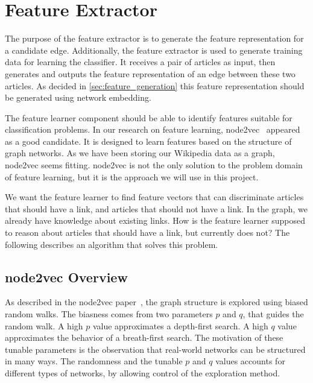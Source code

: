 \section{Feature Extractor}\label{feature_extractor}
The purpose of the feature extractor is to generate the feature representation for a candidate edge. Additionally, the feature extractor is used to generate training data for learning the classifier. It receives a pair of articles as input, then generates and outputs the feature representation of an edge between these two articles. As decided in \cref{sec:feature_generation} this feature representation should be generated using network embedding.




The feature learner component should be able to identify features suitable for classification problems. In our research on feature learning, node2vec~\cite{node2vec} appeared as a good candidate. It is designed to learn features based on the structure of graph networks. As we have been storing our Wikipedia data as a graph, node2vec seems fitting. node2vec is not the only solution to the problem domain of feature learning, but it is the approach we will use in this project.

We want the feature learner to find feature vectors that can discriminate articles that should have a link, and articles that should not have a link. In the graph, we already have knowledge about existing links. How is the feature learner supposed to reason about articles that should have a link, but currently does not? The following describes an algorithm that solves this problem.

\subsection{node2vec Overview}
As described in the node2vec paper~\cite{node2vec}, the graph structure is explored using biased random walks. The biasness comes from two parameters $p$ and $q$, that guides the random walk. A high $p$  value approximates a depth-first search. A high $q$  value approximates the behavior of a breath-first search. The motivation of these tunable parameters is the observation that real-world networks can be structured in many ways. The randomness and the tunable $p$ and $q$ values accounts for different types of networks, by allowing control of the exploration method.

